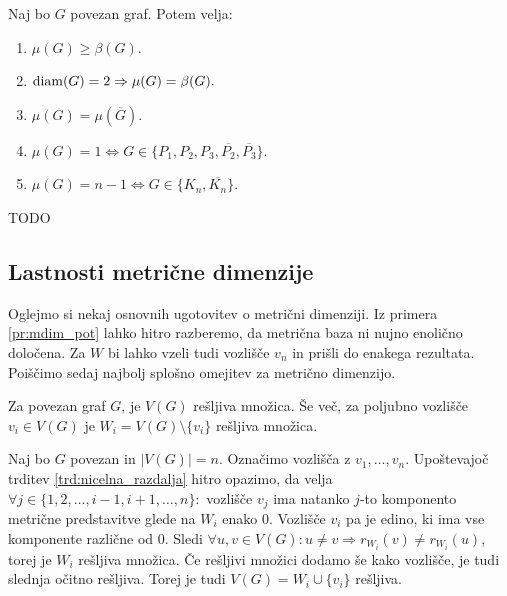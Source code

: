 \documentclass[mat1, tisk]{fmfdelo}
\newcommand{\1}{(1, 1, \ldots, 1)}
\newcommand{\2}{(2, 2, \ldots, 2)}
\begin{document}
\begin{trditev} \label{trd:lastnosti_sdim}
    Naj bo $G$ povezan graf. Potem velja:
    \begin{enumerate}
        \item $\mu(G) \geq \beta(G)$.
        \item ${\rm diam}(G) = 2 \Rightarrow \mu(G) = \beta(G).$
        \item $\mu(G) = \mu(\overline{G}).$
        \item $\mu(G) = 1 \Leftrightarrow G \in \{P_1, P_2, P_3, \overline{P_2}, \overline{P_3}\}.$
        \item $\mu(G) = n - 1 \Leftrightarrow G \in \{K_n, \overline{K_n}\}.$
    \end{enumerate}
\end{trditev}

\begin{dokaz}
    TODO
\end{dokaz}



\subsection{Lastnosti metrične dimenzije} \label{s:lastnosti_mdim}

Oglejmo si nekaj osnovnih ugotovitev o metrični dimenziji. Iz primera \ref{pr:mdim_pot}
lahko hitro razberemo, da metrična baza ni nujno enolično določena. Za $W$ bi lahko 
vzeli tudi vozlišče $v_n$ in prišli do enakega rezultata. 
Poiščimo sedaj najbolj splošno omejitev za metrično dimenzijo.

\begin{trditev} \label{trd:cela_resljiva}
Za povezan graf $G$, je $V(G)$ rešljiva množica. Še več, za poljubno vozlišče $v_i \in V(G)$
je $W_i = V(G) \setminus \{ v_i\}$ rešljiva množica.
\end{trditev}

\begin{dokaz}
Naj bo $G$ povezan in $|V(G)|= n$. Označimo vozlišča z $v_1, \ldots, v_n$.
Upoštevajoč trditev \ref{trd:nicelna_razdalja} hitro opazimo, da velja 
$\forall j \in \{ 1, 2, \ldots , i - 1, i + 1, \ldots , n\}:$ vozlišče $v_j$ ima natanko $j$-to komponento 
metrične predstavitve glede na $W_i$ enako $0$. Vozlišče $v_i$ pa je edino, ki ima vse komponente 
različne od $0.$ Sledi $\forall u, v \in V(G): u \neq v \Rightarrow r_{W_i}(v) \neq r_{W_i}(u)$, 
torej je $W_i$ rešljiva množica.
Če rešljivi množici dodamo še kako vozlišče, je tudi slednja očitno rešljiva. Torej je tudi 
$V(G) = W_i \cup \{ v_i\}$  rešljiva.
\end{dokaz}
\end{document}
